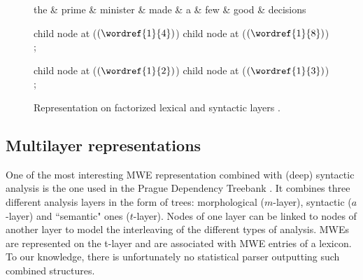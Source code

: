 \documentclass[output=paper]{LSP/langsci}
\begin{document}
\begin{figure}[t]
\small
\begin{center}
\begin{dependency}[edge unit distance=2ex]
\begin{deptext}[column sep=.7cm]
the \& prime \& minister \& made \& a \& few \& good \& decisions \\
\end{deptext}


child{
 node at ($(\wordref{1}{4})$) {}
}
child{
 node at ($(\wordref{1}{8})$) {}
};


child{
 node at ($(\wordref{1}{2})$) {}
}
child{
 node at ($(\wordref{1}{3})$) {}
};


\end{dependency}
\vspace{-0.3cm}
\caption{Representation on factorized lexical and syntactic layers \citep{constantnivre16}.}
\label{fig:combined}
\end{center}
\end{figure}




\subsection{Multilayer representations}
\label{ssec:multilayer}

One of the most interesting MWE representation combined with (deep) syntactic analysis is the one used in the Prague Dependency Treebank \citep{prague}. It combines three different analysis layers in the form of trees: morphological ($m$-layer), syntactic ($a$-layer) and ``semantic" ones ($t$-layer). Nodes of one layer can be linked to nodes of another layer to model the interleaving of the different types of analysis. MWEs are represented on the t-layer and are associated with MWE entries of a lexicon. To our knowledge, there is unfortunately no statistical parser outputting such combined structures. 
\end{document}
